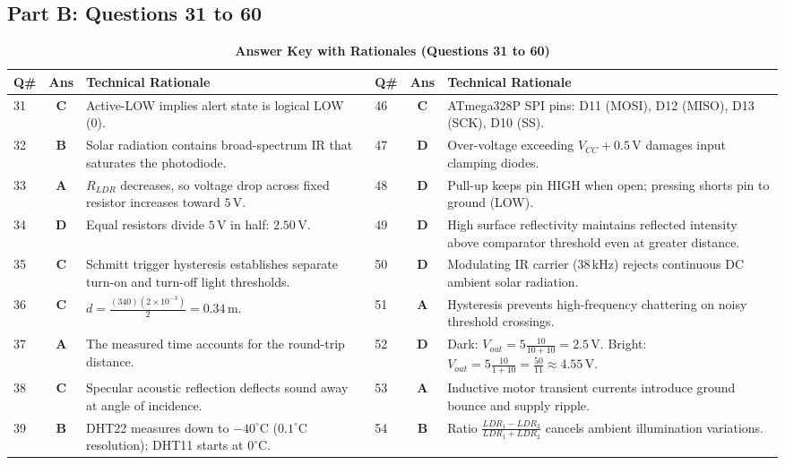 \subsection*{Part B: Questions 31 to 60}
\begin{table}[htbp]
\centering
\caption{\textbf{Answer Key with Rationales (Questions 31 to 60)}}
\vspace{2mm}
\small
\begin{tabularx}{\textwidth}{l c X l c X}
\toprule
\textbf{Q\#} & \textbf{Ans} & \textbf{Technical Rationale} & \textbf{Q\#} & \textbf{Ans} & \textbf{Technical Rationale} \\
\midrule
31 & \textbf{C} & Active-LOW implies alert state is logical LOW (0). & 46 & \textbf{C} & ATmega328P SPI pins: D11 (MOSI), D12 (MISO), D13 (SCK), D10 (SS). \\
32 & \textbf{B} & Solar radiation contains broad-spectrum IR that saturates the photodiode. & 47 & \textbf{D} & Over-voltage exceeding $V_{CC}+0.5\,\text{V}$ damages input clamping diodes. \\
33 & \textbf{A} & $R_{LDR}$ decreases, so voltage drop across fixed resistor increases toward $5\,\text{V}$. & 48 & \textbf{D} & Pull-up keeps pin HIGH when open; pressing shorts pin to ground (LOW). \\
34 & \textbf{D} & Equal resistors divide $5\,\text{V}$ in half: $2.50\,\text{V}$. & 49 & \textbf{D} & High surface reflectivity maintains reflected intensity above comparator threshold even at greater distance. \\
35 & \textbf{C} & Schmitt trigger hysteresis establishes separate turn-on and turn-off light thresholds. & 50 & \textbf{D} & Modulating IR carrier ($38\,\text{kHz}$) rejects continuous DC ambient solar radiation. \\
36 & \textbf{C} & $d = \frac{(340)(2\times 10^{-3})}{2} = 0.34\,\text{m}$. & 51 & \textbf{A} & Hysteresis prevents high-frequency chattering on noisy threshold crossings. \\
37 & \textbf{A} & The measured time accounts for the round-trip distance. & 52 & \textbf{D} & Dark: $V_{out} = 5\frac{10}{10+10} = 2.5\,\text{V}$. Bright: $V_{out} = 5\frac{10}{1+10} = \frac{50}{11} \approx 4.55\,\text{V}$. \\
38 & \textbf{C} & Specular acoustic reflection deflects sound away at angle of incidence. & 53 & \textbf{A} & Inductive motor transient currents introduce ground bounce and supply ripple. \\
39 & \textbf{B} & DHT22 measures down to $-40^\circ\text{C}$ ($0.1^\circ\text{C}$ resolution); DHT11 starts at $0^\circ\text{C}$. & 54 & \textbf{B} & Ratio $\frac{LDR_1 - LDR_2}{LDR_1 + LDR_2}$ cancels ambient illumination variations. \\

\end{tabularx}
\end{table}
